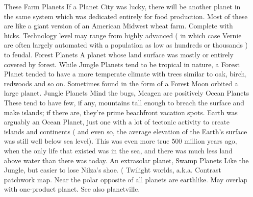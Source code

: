 \documentclass[12pt]{book}
\begin{document}
These Farm Planets  If a Planet City was lucky, there will be another planet in the same system which was dedicated entirely for food production. Most of these are like a giant version of an American Midwest wheat farm. Complete with hicks. Technology level may range from highly advanced ( in which case Vernie are often largely automated with a population as low as hundreds or thousands ) to feudal. Forest Planets  A planet whose land surface was mostly or entirely covered by forest. While Jungle Planets tend to be tropical in nature, a Forest Planet tended to have a more temperate climate with trees similar to oak, birch, redwoods and so on. Sometimes found in the form of a Forest Moon orbited a large planet. Jungle Planets  Mind the bugs, Meagen are positively Ocean Planets  These tend to have few, if any, mountains tall enough to breach the surface and make islands; if there are, they're prime beachfront vacation spots. Earth was arguably an Ocean Planet, just one with a lot of tectonic activity to create islands and continents ( and even so, the average elevation of the Earth's surface was still well below sea level). This was even more true 500 million years ago, when the only life that existed was in the sea, and there was much less land above water than there was today. An extrasolar planet, Swamp Planets  Like the Jungle, but easier to lose Nilza's shoe. (  Twilight worlds, a.k.a. Contrast patchwork map. Near the polar opposite of all planets are earthlike. May overlap with one-product planet. See also planetville.
\end{document}
